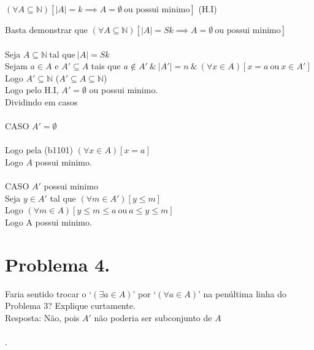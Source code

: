 \documentclass[a4paper]{article}
\def\nats{{\mathbb N}}
\def\halmos{ \begin{flushright} \RectangleBold \end{flushright}}
\begin{document}
\begin{center} $(\forall A \subseteq \nats)[|A|=k \implies A=\emptyset \ \text{ou possui minimo}]$  (H.I)\end{center}
Basta demonstrar que $(\forall A \subseteq \nats)[|A|=Sk \implies A=\emptyset \ \text{ou possui minimo}]$\\ \\
Seja $A \subseteq \nats \ \text{tal que} \ |A|=Sk$\\
Sejam $a\in A$ e $A' \subseteq A$ tais que $a\notin A' \ \& \ |A'| = n \ \& \ (\forall x \in A)[x=a \ \text{ou} \ x \in A']$\\
Logo $A' \subseteq \nats$ ($A' \subseteq A \subseteq \nats$)\\
Logo pelo H.I,  $A'= \emptyset$ ou possui minimo.\\
Dividindo em casos \\ \\
CASO $A'=\emptyset$\\ \\ 
Logo pela (b1101) $(\forall x \in A)[x=a]$\\
Logo $A$ possui minimo.\\ \\
CASO $A'$ possui minimo\\ 
Seja $y \in A'$ tal que $(\forall m \in A')[y \leq m]$\\
Logo $(\forall m \in A)[y \leq m\leq a \ \text{ou} \ a \leq y\leq m]$\\
Logo A possui minimo.
 \halmos

\newpage
\section*{Problema 4.}
Faria sentido trocar o ‘$(\exists a \in A)$’ por ‘$(\forall a \in A)$’ na penúltima linha do Problema 3? Explique curtamente.\\
Resposta:
Não, pois $A'$ não poderia ser subconjunto de $A$ \\ \\




\pagestyle{fancy}.
\end{document}
